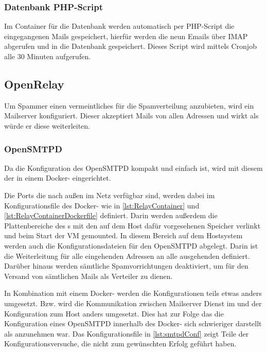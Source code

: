 \documentclass[a4paper,11pt,singlespacing]{article}
\begin{document}
		\subsubsection{Datenbank PHP-Script}\label{DB-Hook-Container}
			Im Container für die Datenbank werden automatisch per PHP-Script die eingegangenen Mails gespeichert, hierfür werden die neun Emails über IMAP abgerufen und in die Datenbank gespeichert. Dieses Script wird mittels Cronjob alle 30 Minuten aufgerufen.

	\subsection{OpenRelay}\label{sec:UmsetzungOpenRelay} %
		Um Spammer einen vermeintliches  für die Spamverteilung anzubieten, wird ein Mailserver konfiguriert. Dieser akzeptiert Mails von allen Adressen und wirkt als würde er diese weiterleiten.
		
		\subsubsection{OpenSMTPD}\label{OpenRelayOpenSMTPD}
			Da die Konfiguration des \textsf{OpenSMTPD} kompakt und einfach ist, wird mit diesem der  in einem Docker- eingerichtet.
			
			Die Ports die nach au{\ss}en im Netz verfügbar sind, werden dabei im Konfigurationsfile des Docker- wie in \autoref{lst:RelayContainer} und \autoref{lst:RelayContainerDockerfile} definiert. Darin werden au{\ss}erdem die Plattenbereiche des s mit den auf dem Host dafür vorgesehenen Speicher verlinkt und beim Start der VM gemounted. In diesem Bereich auf dem Hostsystem werden auch die Konfigurationsdateien für den \textsf{OpenSMTPD} abgelegt. Darin ist die Weiterleitung für alle eingehenden Adressen an alle ausgehenden definiert. Darüber hinaus werden sämtliche Spamvorrichtungen deaktiviert, um für den Versand von sämtlichen Mails als Verteiler zu dienen.
			
			In Kombination mit einem Docker- werden die Konfigurationen teils etwas anders umgesetzt. Bzw. wird die Kommunikation zwischen Mailserver Dienst im  und der  Konfiguration zum Host anders umgesetzt. Dies hat zur Folge das die Konfiguration eines \textsf{OpenSMTPD} innerhalb des Docker- sich schwieriger darstellt als anzunehmen war. Das Konfigurationsfile in \autoref{lst:smtpdConf} zeigt Teile der Konfigurationsversuche, die nicht zum gewünschten Erfolg geführt haben. 
						
\end{document}
